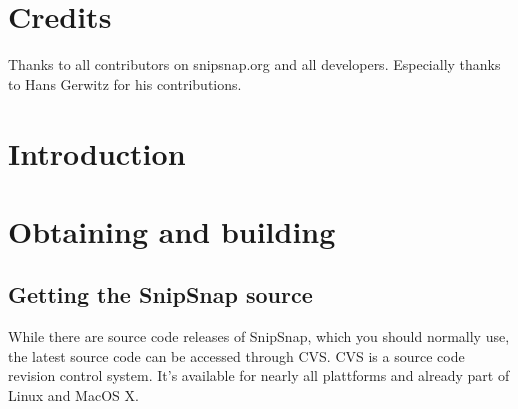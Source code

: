 \documentclass[a4paper,pdftex]{article}
\begin{document}
  
  \thispagestyle{empty}

  {\raggedleft{}
 
   }
 
  \newpage
  \pagestyle{empty}
  \tableofcontents
  \newpage
  \pagestyle{fancy}

\section{Credits}

Thanks to all contributors on snipsnap.org and all developers. Especially thanks to Hans Gerwitz for his contributions.

\section{Introduction}

\section{Obtaining and building}

\subsection{Getting the SnipSnap source}

While there are source code releases of SnipSnap, which you should normally use,
the latest source code can be accessed through CVS. CVS is a source code revision
control system\cite{CVS}. It's available for nearly all plattforms and already part of Linux and
MacOS X.
\end{document}
